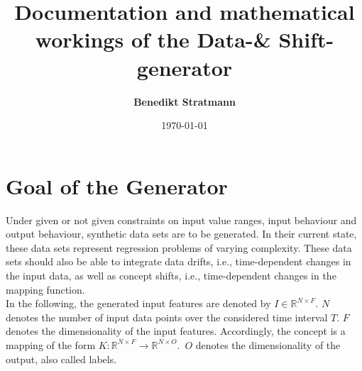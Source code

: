 \documentclass[12pt,a4paper,oneside,ngerman]{article}
\title{\Huge\bfseries Documentation and mathematical workings of the Data-\& Shift- generator}
\author{\huge\textbf{Benedikt Stratmann}}
\date{\vspace{0cm}\today}
\newcommand{\Concept}{K}
\theoremstyle{plain}
\begin{document}
	
	

	\pagestyle{plain}
	
	\maketitle

	
	\pagestyle{headings}
	\section{Goal of the Generator}
	Under given or not given constraints on input value ranges, input behaviour and output behaviour, synthetic data sets are to be generated. In their current state, these data sets represent regression problems of varying complexity. These data sets should also be able to integrate data drifts, i.e., time-dependent changes in the input data, as well as concept shifts, i.e., time-dependent changes in the mapping function.\\
	In the following, the generated input features are denoted by $I\in \mathbb{R}^{N\times F}$.
	$N$ denotes the number of input data points over the considered time interval $T$.
	$F$ denotes the dimensionality of the input features.
	Accordingly, the concept is a mapping of the form $\Concept : \mathbb{R}^{N\times F}\rightarrow \mathbb{R}^{N\times O}$.\
	$O$ denotes the dimensionality of the output, also called labels.

	
\end{document}

